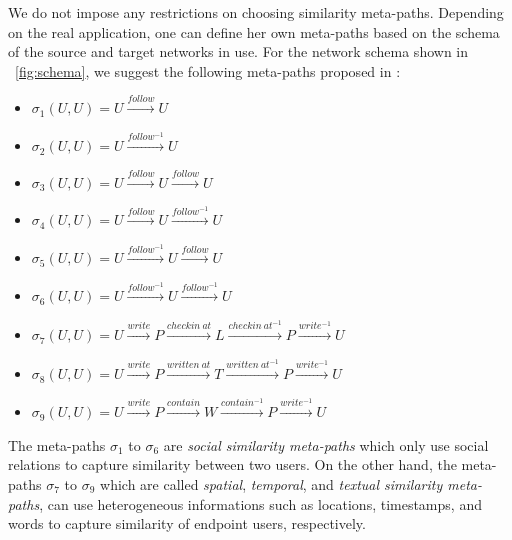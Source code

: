 \documentclass[conference]{IEEEtran}
\begin{document}
We do not impose any restrictions on choosing similarity meta-paths. Depending on the real application, one can define her own meta-paths based on the schema of the source and target networks in use. For the network schema shown in \figurename~\ref{fig:schema}, we suggest the following meta-paths proposed in \cite{zhang2014meta}:

\begin{itemize}
\item $\sigma_1(U,U)=U\xrightarrow{follow}U$
\item $\sigma_2(U,U)=U\xrightarrow{follow^{-1}}U$
\item $\sigma_3(U,U)=U\xrightarrow{follow}U\xrightarrow{follow}U$
\item $\sigma_4(U,U)=U\xrightarrow{follow}U\xrightarrow{follow^{-1}}U$
\item $\sigma_5(U,U)=U\xrightarrow{follow^{-1}}U\xrightarrow{follow}U$
\item $\sigma_6(U,U)=U\xrightarrow{follow^{-1}}U\xrightarrow{follow^{-1}}U$
\item $\sigma_7(U,U)=U\xrightarrow{write}P\xrightarrow{checkin\ at}L\xrightarrow{checkin\ at^{-1}}P\xrightarrow{write^{-1}}U$
\item $\sigma_8(U,U)=U\xrightarrow{write}P\xrightarrow{written\ at}T\xrightarrow{written\ at^{-1}}P\xrightarrow{write^{-1}}U$
\item $\sigma_9(U,U)=U\xrightarrow{write}P\xrightarrow{contain}W\xrightarrow{contain^{-1}}P\xrightarrow{write^{-1}}U$
\end{itemize}

The meta-paths $\sigma_1$ to $\sigma_6$ are \textit{social similarity meta-paths} which only use social relations to capture similarity between two users. On the other hand, the meta-paths $\sigma_7$ to $\sigma_9$ which are called \textit{spatial}, \textit{temporal}, and \textit{textual similarity meta-paths}, can use heterogeneous informations such as locations, timestamps, and words to capture similarity of endpoint users, respectively.
\end{document}
